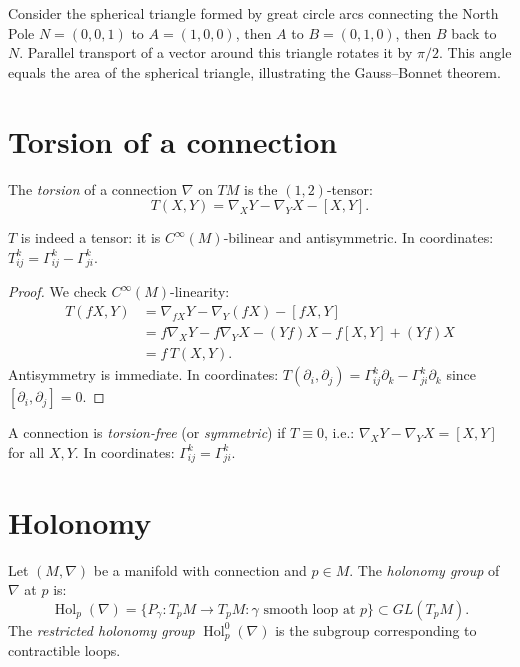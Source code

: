 \begin{example}
Consider the spherical triangle formed by great circle arcs connecting the
North Pole $N = (0,0,1)$ to $A = (1,0,0)$, then $A$ to $B = (0,1,0)$,
then $B$ back to $N$. Parallel transport of a vector around this triangle
rotates it by $\pi/2$. This angle equals the area of the spherical triangle,
illustrating the Gauss--Bonnet theorem.
\end{example}

\section{Torsion of a connection}

\begin{definition}
The \emph{torsion} of a connection $\nabla$ on $TM$ is the $(1,2)$-tensor:
\[
    T(X, Y) = \nabla_X Y - \nabla_Y X - [X, Y].
\]
\end{definition}

\begin{proposition}
$T$ is indeed a tensor: it is $C^\infty(M)$-bilinear and antisymmetric.
In coordinates: $T^k_{ij} = \Gamma^k_{ij} - \Gamma^k_{ji}$.
\end{proposition}

\begin{proof}
We check $C^\infty(M)$-linearity:
\begin{align*}
    T(fX, Y) &= \nabla_{fX} Y - \nabla_Y(fX) - [fX, Y] \\
    &= f\nabla_X Y - f\nabla_Y X - (Yf)X - f[X,Y] + (Yf)X \\
    &= f\, T(X, Y).
\end{align*}
Antisymmetry is immediate. In coordinates:
$T(\partial_i, \partial_j) = \Gamma^k_{ij}\partial_k - \Gamma^k_{ji}\partial_k$
since $[\partial_i, \partial_j] = 0$.
\end{proof}

\begin{definition}
A connection is \emph{torsion-free} (or \emph{symmetric}) if $T \equiv 0$,
i.e.: $\nabla_X Y - \nabla_Y X = [X, Y]$ for all $X, Y$.
In coordinates: $\Gamma^k_{ij} = \Gamma^k_{ji}$.
\end{definition}

\section{Holonomy}

\begin{definition}
Let $(M, \nabla)$ be a manifold with connection and $p \in M$. The
\emph{holonomy group} of $\nabla$ at $p$ is:
\[
    \operatorname{Hol}_p(\nabla) = \{ P_\gamma : T_pM \to T_pM :
    \gamma \text{ smooth loop at } p \} \subset GL(T_pM).
\]
The \emph{restricted holonomy group} $\operatorname{Hol}^0_p(\nabla)$ is the
subgroup corresponding to contractible loops.
\end{definition}


